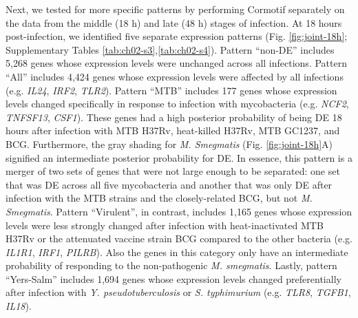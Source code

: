 Next, we tested for more specific patterns by performing Cormotif
separately on the data from the middle (18 h) and late (48 h) stages of
infection. At 18 hours post-infection, we identified five separate
expression patterns (Fig. \ref{fig:joint-18h}; Supplementary Tables \ref{tab:ch02-s3},\ref{tab:ch02-s4}). Pattern
``non-DE'' includes 5,268 genes whose expression levels were unchanged
across all infections. Pattern ``All'' includes 4,424 genes whose
expression levels were affected by all infections (e.g. \emph{IL24},
\emph{IRF2}, \emph{TLR2}). Pattern ``MTB'' includes 177 genes whose
expression levels changed specifically in response to infection with
mycobacteria (e.g. \emph{NCF2}, \emph{TNFSF13}, \emph{CSF1}). These
genes had a high posterior probability of being DE 18 hours after
infection with MTB H37Rv, heat-killed H37Rv, MTB GC1237, and BCG.
Furthermore, the gray shading for \emph{M. Smegmatis} (Fig. \ref{fig:joint-18h}A)
signified an intermediate posterior probability for DE. In essence, this
pattern is a merger of two sets of genes that were not large enough to
be separated: one set that was DE across all five mycobacteria and
another that was only DE after infection with the MTB strains and the
closely-related BCG, but not \emph{M. Smegmatis}. Pattern ``Virulent'',
in contrast, includes 1,165 genes whose expression levels were less
strongly changed after infection with heat-inactivated MTB H37Rv or the
attenuated vaccine strain BCG compared to the other bacteria (e.g.
\emph{IL1R1}, \emph{IRF1}, \emph{PILRB}). Also the genes in this
category only have an intermediate probability of responding to the
non-pathogenic \emph{M. smegmatis}. Lastly, pattern ``Yers-Salm''
includes 1,694 genes whose expression levels changed preferentially
after infection with \emph{Y. pseudotuberculosis} or \emph{S.
typhimurium} (e.g. \emph{TLR8}, \emph{TGFB1}, \emph{IL18}).

